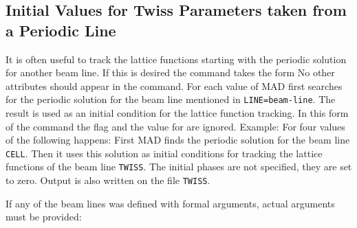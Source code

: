 \subsection{Initial Values for Twiss Parameters taken from a Periodic
Line}
It is often useful to track the lattice functions
starting with the periodic solution for another beam line.
If this is desired the  command takes the form
No other attributes should appear in the command.
For each value of  MAD first searches for the periodic
solution for the beam line mentioned in {\tt LINE=beam-line}.
The result is used as an initial condition for the lattice function
tracking.
In this form of the  command
the  flag and the value for  are ignored.
Example:
For four values of  the following happens:
First MAD finds the periodic solution for the beam line {\tt CELL}.
Then it uses this solution as initial conditions for tracking
the lattice functions of the beam line {\tt TWISS}.
The initial phases are not specified, they are set to zero.
Output is also written on the file {\tt TWISS}.
 
If any of the beam lines was defined with formal arguments,
actual arguments must be provided:
 
